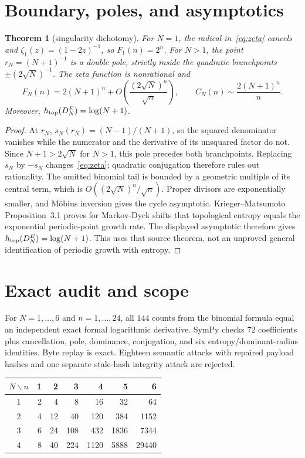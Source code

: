\documentclass[11pt]{article}
\newtheorem{theorem}{Theorem}
\begin{document}
\section{Boundary, poles, and asymptotics}
\begin{theorem}[singularity dichotomy]
For $N=1$, the radical in~\eqref{eq:zeta} cancels and
$\zeta_1(z)=(1-2z)^{-1}$, so $F_1(n)=2^n$.  For $N>1$, the point
$r_N=(N+1)^{-1}$ is a double pole, strictly inside the quadratic branchpoints
$\pm(2\sqrt N)^{-1}$.  The zeta function is nonrational and
\[
 F_N(n)=2(N+1)^n+O\!\left(\frac{(2\sqrt N)^n}{\sqrt n}\right),
 \qquad C_N(n)\sim\frac{2(N+1)^n}{n}.
\]
Moreover, $h_{\rm top}(D_N^E)=\log(N+1)$.
\end{theorem}
\begin{proof}
At $r_N$, $s_N(r_N)=(N-1)/(N+1)$, so the squared denominator vanishes while
the numerator and the derivative of its unsquared factor do not.  Since
$N+1>2\sqrt N$ for $N>1$, this pole precedes both branchpoints.  Replacing
$s_N$ by $-s_N$ changes~\eqref{eq:zeta}; quadratic conjugation therefore rules
out rationality.  The omitted binomial tail is bounded by a geometric multiple
of its central term, which is
$O((2\sqrt N)^n/\sqrt n)$.  Proper divisors are exponentially smaller, and
M\"obius inversion gives the cycle asymptotic.
Krieger--Matsumoto Proposition~3.1 proves for Markov-Dyck shifts that
topological entropy equals the exponential periodic-point growth rate.  The
displayed asymptotic therefore gives $h_{\rm top}(D_N^E)=\log(N+1)$.  This
uses that source theorem, not an unproved general identification of periodic
growth with entropy.
\end{proof}

\section{Exact audit and scope}
For $N=1,\ldots,6$ and $n=1,\ldots,24$, all $144$ counts from the binomial
formula equal an independent exact formal logarithmic derivative.  SymPy
checks $72$ coefficients plus cancellation, pole, dominance, conjugation, and
six entropy/dominant-radius identities.  Byte replay is exact.  Eighteen semantic attacks with repaired
payload hashes and one separate stale-hash integrity attack are rejected.

\begin{center}
\small
\begin{tabular}{crrrrrr}
\toprule
$N\backslash n$ & 1 & 2 & 3 & 4 & 5 & 6\\
\midrule
1 & 2 & 4 & 8 & 16 & 32 & 64\\
2 & 4 & 12 & 40 & 120 & 384 & 1152\\
3 & 6 & 24 & 108 & 432 & 1836 & 7344\\
4 & 8 & 40 & 224 & 1120 & 5888 & 29440\\
\bottomrule
\end{tabular}
\end{center}
\end{document}

